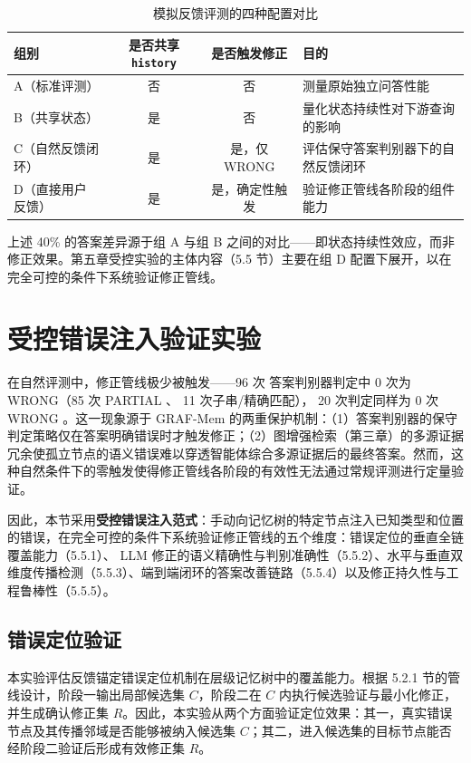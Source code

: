 \begin{table}[htbp]
\centering
\caption{模拟反馈评测的四种配置对比}
\label{tab:5-0}
\begin{tabularx}{\linewidth}{lccX}
\toprule
组别 & 是否共享 \texttt{history} & 是否触发修正 & 目的 \\
\midrule
A（标准评测） & 否 & 否 & 测量原始独立问答性能 \\
B（共享状态） & 是 & 否 & 量化状态持续性对下游查询的影响 \\
C（自然反馈闭环） & 是 & 是，仅 WRONG & 评估保守答案判别器下的自然反馈闭环 \\
D（直接用户反馈） & 是 & 是，确定性触发 & 验证修正管线各阶段的组件能力 \\
\bottomrule
\end{tabularx}
\end{table}

上述 40\% 的答案差异源于组 A 与组 B 之间的对比——即状态持续性效应，而非修正效果。第五章受控实验的主体内容（5.5 节）主要在组 D 配置下展开，以在完全可控的条件下系统验证修正管线。

\section{受控错误注入验证实验}

在自然评测中，修正管线极少被触发——96 次 答案判别器判定中 0 次为 WRONG（85 次 PARTIAL 、 11 次子串/精确匹配）， 20 次判定同样为 0 次 WRONG 。这一现象源于 GRAF-Mem 的两重保护机制：（1）答案判别器的保守判定策略仅在答案明确错误时才触发修正；（2）图增强检索（第三章）的多源证据冗余使孤立节点的语义错误难以穿透智能体综合多源证据后的最终答案。然而，这种自然条件下的零触发使得修正管线各阶段的有效性无法通过常规评测进行定量验证。

因此，本节采用\textbf{受控错误注入范式}：手动向记忆树的特定节点注入已知类型和位置的错误，在完全可控的条件下系统验证修正管线的五个维度：错误定位的垂直全链覆盖能力（5.5.1）、 LLM 修正的语义精确性与判别准确性（5.5.2）、水平与垂直双维度传播检测（5.5.3）、端到端闭环的答案改善链路（5.5.4）以及修正持久性与工程鲁棒性（5.5.5）。

\subsection{错误定位验证}

本实验评估反馈锚定错误定位机制在层级记忆树中的覆盖能力。根据 5.2.1 节的管线设计，阶段一输出局部候选集 $C$，阶段二在 $C$ 内执行候选验证与最小化修正，并生成确认修正集 $R$。因此，本实验从两个方面验证定位效果：其一，真实错误节点及其传播邻域是否能够被纳入候选集 $C$；其二，进入候选集的目标节点能否经阶段二验证后形成有效修正集 $R$。


